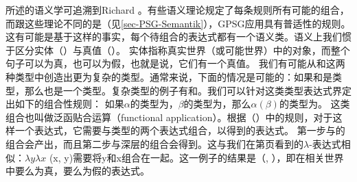  所述的语义学可追溯到Richard  \citet{Montague74a-u}。有些语义理论规定了每条规则所有可能的组合，而跟这些理论不同的是（见\ref{sec-PSG-Semantik}），GPSG应用具有普适性的规则。
这有可能是基于这样的事实，每个待组合的表达式都有一个语义类。语义上我们惯于区分实体（）与真值（）。
实体指称真实世界（或可能世界）中的对象，而整个句子可以为真，也可以为假，也就是说，它们有一个真值。
我们有可能从和这两种类型中创造出更为复杂的类型。通常来说，下面的情况是可能的：如果和是类型，那么也是一个类型。复杂类型的例子有和。我们可以针对这类类型表达式界定出如下的组合性规则：
\ea
如果$\alpha$的类型为，$\beta$的类型为，那么$\alpha(\beta)$的类型为。
\z
这类组合也叫做泛函贴合运算（functional application）。根据（）中的规则，对于这样一个表达式，它需要与类型的两个表达式组合，以得到的表达式。
  第一步与的组合会产出，而且第二步与深层的组合会得到。这与我们在第\pageref{lambda-moegen}页看到的$\lambda$-表达式相似：$\lambda y \lambda x$ (x, y)需要将y和x组合在一起。这一例子的结果是（, ），即在相关世界中要么为真，要么为假的表达式。

